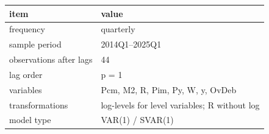 \begin{tabular}{ll}
\toprule
item & value\\
\midrule
frequency & quarterly\\
sample period & 2014Q1--2025Q1\\
observations after lags & 44\\
lag order & p = 1\\
variables & Pcm, M2, R, Pim, Py, W, y, OvDeb\\
\addlinespace
transformations & log-levels for level variables; R without log\\
model type & VAR(1) / SVAR(1)\\
\bottomrule
\end{tabular}
